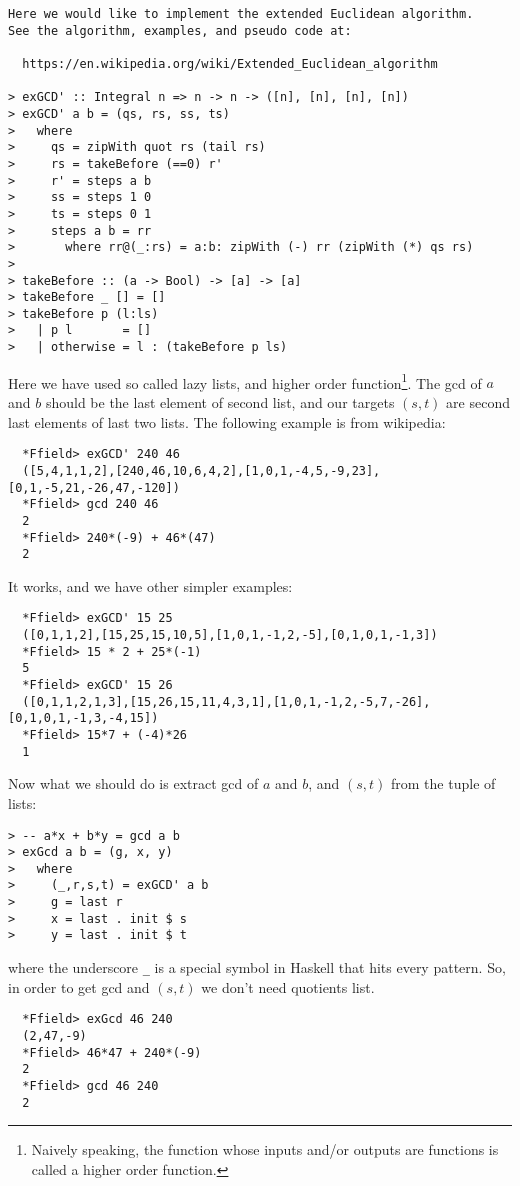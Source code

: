 \documentclass[11pt]{book}
\begin{document}
\label{extendedEuclideanAlgorithm}
\begin{verbatim}
Here we would like to implement the extended Euclidean algorithm.
See the algorithm, examples, and pseudo code at:

  https://en.wikipedia.org/wiki/Extended_Euclidean_algorithm

> exGCD' :: Integral n => n -> n -> ([n], [n], [n], [n])
> exGCD' a b = (qs, rs, ss, ts)
>   where
>     qs = zipWith quot rs (tail rs)
>     rs = takeBefore (==0) r'
>     r' = steps a b
>     ss = steps 1 0
>     ts = steps 0 1
>     steps a b = rr
>       where rr@(_:rs) = a:b: zipWith (-) rr (zipWith (*) qs rs)
>         
> takeBefore :: (a -> Bool) -> [a] -> [a]
> takeBefore _ [] = []
> takeBefore p (l:ls)
>   | p l       = []
>   | otherwise = l : (takeBefore p ls)
\end{verbatim}
Here we have used so called lazy lists, and higher order function\footnote{
Naively speaking, the function whose inputs and/or outputs are functions is called a higher order function.
}.
The gcd of $a$ and $b$ should be the last element of second list, and our targets $(s,t)$ are second last elements of last two lists.
The following example is from wikipedia:
\begin{verbatim}
  *Ffield> exGCD' 240 46
  ([5,4,1,1,2],[240,46,10,6,4,2],[1,0,1,-4,5,-9,23],[0,1,-5,21,-26,47,-120])
  *Ffield> gcd 240 46
  2
  *Ffield> 240*(-9) + 46*(47)
  2
\end{verbatim}
It works, and we have other simpler examples:
\begin{verbatim}
  *Ffield> exGCD' 15 25
  ([0,1,1,2],[15,25,15,10,5],[1,0,1,-1,2,-5],[0,1,0,1,-1,3])
  *Ffield> 15 * 2 + 25*(-1)
  5
  *Ffield> exGCD' 15 26
  ([0,1,1,2,1,3],[15,26,15,11,4,3,1],[1,0,1,-1,2,-5,7,-26],[0,1,0,1,-1,3,-4,15])
  *Ffield> 15*7 + (-4)*26
  1
\end{verbatim}
Now what we should do is extract gcd of $a$ and $b$, and $(s,t)$ from the tuple of lists:
\begin{verbatim}
> -- a*x + b*y = gcd a b
> exGcd a b = (g, x, y)
>   where
>     (_,r,s,t) = exGCD' a b
>     g = last r
>     x = last . init $ s
>     y = last . init $ t
\end{verbatim}
where the underscore \verb+_+ is a special symbol in Haskell that hits every pattern.
So, in order to get gcd and $(s,t)$ we don't need quotients list.
\begin{verbatim}
  *Ffield> exGcd 46 240
  (2,47,-9)
  *Ffield> 46*47 + 240*(-9)
  2
  *Ffield> gcd 46 240
  2
\end{verbatim}
\end{document}
